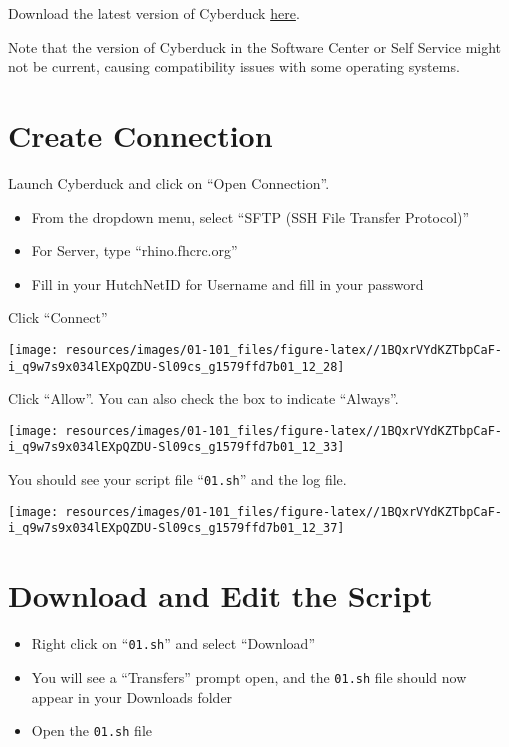 \documentclass[
]{book}
\providecommand{\tightlist}{%
  \setlength{\itemsep}{0pt}\setlength{\parskip}{0pt}}
\begin{document}
Download the latest version of Cyberduck \href{https://cyberduck.io/download/}{here}.

Note that the version of Cyberduck in the Software Center or Self Service might not be current, causing compatibility issues with some operating systems.

\hypertarget{create-connection}{%
\section{Create Connection}\label{create-connection}}

Launch Cyberduck and click on ``Open Connection''.

\begin{itemize}
\tightlist
\item
  From the dropdown menu, select ``SFTP (SSH File Transfer Protocol)''
\item
  For Server, type ``rhino.fhcrc.org''
\item
  Fill in your HutchNetID for Username and fill in your password
\end{itemize}

Click ``Connect''

\texttt{[image: resources/images/01-101\_files/figure-latex//1BQxrVYdKZTbpCaF-i\_q9w7s9x034lEXpQZDU-Sl09cs\_g1579ffd7b01\_12\_28]}

Click ``Allow''. You can also check the box to indicate ``Always''.

\texttt{[image: resources/images/01-101\_files/figure-latex//1BQxrVYdKZTbpCaF-i\_q9w7s9x034lEXpQZDU-Sl09cs\_g1579ffd7b01\_12\_33]}

You should see your script file ``\texttt{01.sh}'' and the log file.

\texttt{[image: resources/images/01-101\_files/figure-latex//1BQxrVYdKZTbpCaF-i\_q9w7s9x034lEXpQZDU-Sl09cs\_g1579ffd7b01\_12\_37]}

\hypertarget{download-and-edit-the-script}{%
\section{Download and Edit the Script}\label{download-and-edit-the-script}}

\begin{itemize}
\tightlist
\item
  Right click on ``\texttt{01.sh}'' and select ``Download''
\item
  You will see a ``Transfers'' prompt open, and the \texttt{01.sh} file should now appear in your Downloads folder
\item
  Open the \texttt{01.sh} file
\end{itemize}
\end{document}
